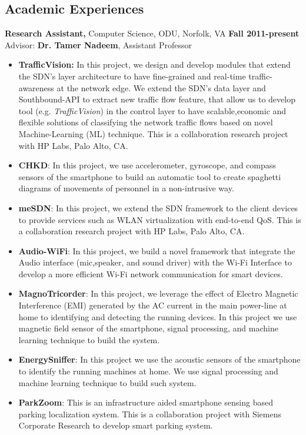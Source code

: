 \documentclass[margin]{res}
\begin{document}
\begin{resume}
\section{Academic Experiences}

 {\bf Research Assistant,} Computer Science, ODU, Norfolk, VA \hfill \textbf{Fall  2011-present} \\
 Advisor: \textbf{Dr. Tamer Nadeem}, Assistant Professor
 \begin{itemize} \itemsep -2pt  %
 \item \textbf{TrafficVision:} In this project, we design and develop modules that extend the SDN's layer architecture to have fine-grained and real-time traffic-awareness at the network edge. We extend the SDN's data layer and Southbound-API to extract new traffic flow feature, that allow us to develop tool (e.g. \textit{TrafficVision}) in the control layer to have scalable,economic and flexible solutions of classifying the network traffic flows based on novel Machine-Learning (ML) technique. This is a collaboration research project with HP Labs, Palo Alto, CA. 
 \item \textbf{CHKD}: In this project, we use accelerometer, gyroscope, and compass sensors of the smartphone to build an automatic tool to create spaghetti diagrams of movements of personnel in a non-intrusive way.
 \item \textbf{meSDN}: In this project, we extend the SDN framework to the client devices to provide services such as WLAN virtualization with end-to-end QoS. This is a collaboration research project with HP Labs, Palo Alto, CA.
 \item \textbf{Audio-WiFi}:  In this project, we build a novel framework that integrate the Audio interface (mic,speaker, and sound driver) with the Wi-Fi Interface to develop a more efficient Wi-Fi network communication for smart devices.
 \item \textbf{MagnoTricorder}: In this project, we leverage the effect of Electro Magnetic Interference (EMI) generated by the AC current in the main power-line at home to identifying and detecting the running devices. In this project we use magnetic field sensor of the smartphone, signal processing, and machine learning technique to build the system.
 \item \textbf{EnergySniffer}: In this project we use the acoustic sensors of the smartphone to identify the running machines at home. We use signal processing and machine learning technique to build such system. 
 \item \textbf{ParkZoom}: This is an infrastructure aided smartphone sensing based parking localization system. This is a collaboration project with Siemens Corporate Research to develop smart parking system. 
 \end{itemize}


\end{resume}
\end{document}
